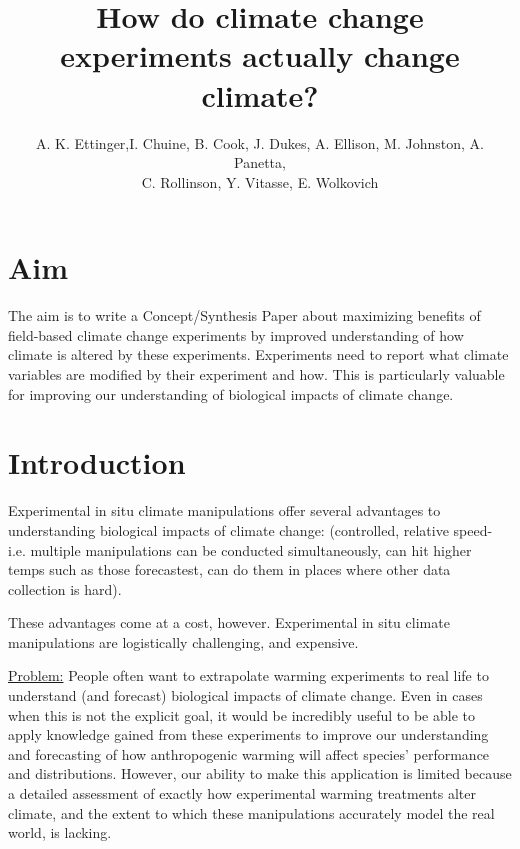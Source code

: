 \documentclass{article}
\begin{document}
% 
\title{How do climate change experiments actually change climate?} %
\author{A. K. Ettinger,I. Chuine, B. Cook, J. Dukes, A. Ellison, M. Johnston, A. Panetta,\\ C. Rollinson, Y. Vitasse, E. Wolkovich}
\maketitle  %

\section {Aim}

The aim is to write a Concept/Synthesis Paper about maximizing benefits of field-based climate change experiments by improved understanding of how climate is altered by these experiments. Experiments need to report what climate variables are modified by their experiment and how. This is particularly valuable for improving our understanding of biological impacts of climate change.

\section {Introduction}

\par Experimental in situ climate manipulations offer several advantages to understanding biological impacts of climate change: (controlled, relative speed- i.e. multiple manipulations can be conducted simultaneously, can hit higher temps such as those forecastest, can do them in places where other data collection is hard).
\par These advantages come at a cost, however. Experimental in situ climate
manipulations are logistically challenging, and expensive.
\par \underline{Problem:} People often want to extrapolate warming experiments to real life to understand (and forecast) biological impacts of climate change. Even in cases when this is not the explicit goal, it would be incredibly useful to be able to apply knowledge gained from these experiments to improve our understanding and forecasting of how anthropogenic warming will affect species' performance and distributions. However, our ability to make this application is limited because a detailed assessment of exactly how experimental warming treatments alter climate, and the extent to which these manipulations accurately model the real world,
is lacking.
\end{document}
